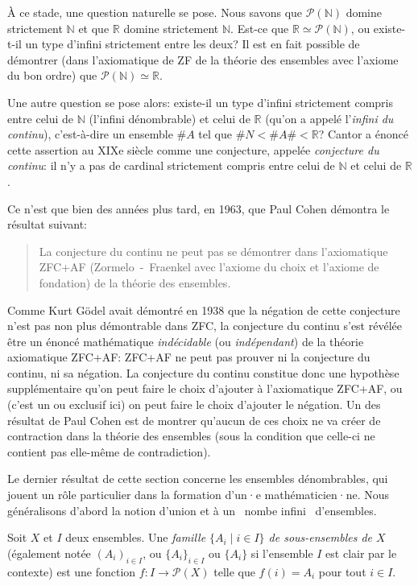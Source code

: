 \documentclass[french,course,oneside,theoremnosection]{lecture}
\newcommand{\R}{\mathbb{R}}
\newcommand{\N}{\mathbb{N}}
\begin{document}
À ce stade, une question naturelle se pose. Nous savons que $\mathcal{P}(\N)$ domine strictement $\N$ et que $\R$ domine strictement $\N$. Est-ce que $\R \simeq \mathcal{P}(\N)$, ou existe-t-il un type d'infini strictement entre les deux? Il est en fait possible de démontrer  (dans l'axiomatique de ZF de la théorie des ensembles avec l'axiome du bon ordre) que $\mathcal{P}(\N) \simeq \R$.

Une autre question se pose alors: existe-il un type d'infini strictement compris entre celui de $\N$ (l'infini dénombrable) et celui de $\R$ (qu'on a appelé l'\emph{infini du continu}), c'est-à-dire un ensemble $\# A$ tel que $\#N < \# A \# < \R$? Cantor a énoncé cette assertion au XIXe siècle comme une conjecture, appelée \emph{conjecture du continu}: il n'y a pas de cardinal strictement compris entre celui de $\N$ et celui de $\R$.

Ce n'est que bien des années plus tard, en 1963, que Paul Cohen démontra le résultat suivant:
\begin{quotation}
La conjecture du continu ne peut pas se démontrer dans l'axiomatique ZFC+AF (Zormelo~-~Fraenkel avec l'axiome du choix et l'axiome de fondation) de la théorie des ensembles.
\end{quotation}
Comme Kurt Gödel avait démontré en 1938 que la négation de cette conjecture n'est pas non plus démontrable dans ZFC, la conjecture du continu s'est révélée être  un énoncé mathématique \emph{indécidable} (ou  \emph{indépendant}) de la théorie axiomatique ZFC+AF: ZFC+AF ne peut pas prouver ni la conjecture du continu, ni sa négation. La conjecture du continu constitue donc une hypothèse supplémentaire qu'on peut faire le choix d'ajouter à l'axiomatique ZFC+AF, ou (c'est un ou exclusif ici) on peut faire le choix d'ajouter le négation. Un des résultat de Paul Cohen est de montrer qu'aucun de ces choix ne va créer de contraction dans la théorie des ensembles (sous la condition que celle-ci ne contient pas elle-même de contradiction). 

Le dernier résultat de cette section concerne les ensembles dénombrables, qui jouent un rôle particulier dans la formation d'un·e mathématicien·ne. Nous généralisons d'abord la notion d'union et à un \og~nombe infini~\fg{} d'ensembles.

\begin{definition}
Soit $X$ et $I$ deux ensembles. Une \emph{famille $\{A_i \mid i \in I\}$ de sous-ensembles de $X$} (également notée $(A_i)_{i\in I}$, ou $\{A_i\}_{i\in I}$ ou $\{A_i\}$ si l'ensemble $I$ est clair par le contexte) est une fonction $f\colon I \to \mathcal{P}(X)$ telle que $f(i)=A_i$ pour tout $i\in I$.
\end{definition}
\end{document}
